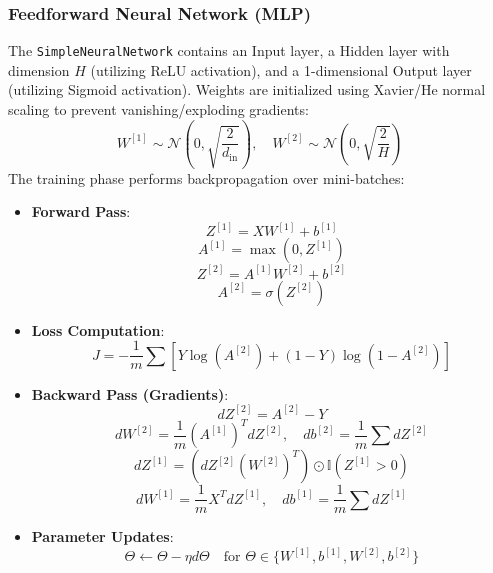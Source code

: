 \documentclass[conference]{IEEEtran}
\begin{document}
\subsubsection{Feedforward Neural Network (MLP)}
The \texttt{SimpleNeuralNetwork} contains an Input layer, a Hidden layer with dimension $H$ (utilizing ReLU activation), and a 1-dimensional Output layer (utilizing Sigmoid activation). 
Weights are initialized using Xavier/He normal scaling to prevent vanishing/exploding gradients:
\begin{equation}
W^{[1]} \sim \mathcal{N}\left(0, \sqrt{\frac{2}{d_{\text{in}}}}\right), \quad W^{[2]} \sim \mathcal{N}\left(0, \sqrt{\frac{2}{H}}\right)
\end{equation}
The training phase performs backpropagation over mini-batches:
\begin{itemize}
\item \textbf{Forward Pass}:
\begin{equation}
Z^{[1]} = X W^{[1]} + b^{[1]}
\end{equation}
\begin{equation}
A^{[1]} = \max(0, Z^{[1]})
\end{equation}
\begin{equation}
Z^{[2]} = A^{[1]} W^{[2]} + b^{[2]}
\end{equation}
\begin{equation}
A^{[2]} = \sigma(Z^{[2]})
\end{equation}
\item \textbf{Loss Computation}:
\begin{equation}
J = -\frac{1}{m} \sum \left[ Y \log(A^{[2]}) + (1 - Y) \log(1 - A^{[2]}) \right]
\end{equation}
\item \textbf{Backward Pass (Gradients)}:
\begin{equation}
dZ^{[2]} = A^{[2]} - Y
\end{equation}
\begin{equation}
dW^{[2]} = \frac{1}{m} (A^{[1]})^T dZ^{[2]}, \quad db^{[2]} = \frac{1}{m} \sum dZ^{[2]}
\end{equation}
\begin{equation}
dZ^{[1]} = \left( dZ^{[2]} (W^{[2]})^T \right) \odot \mathbb{I}(Z^{[1]} > 0)
\end{equation}
\begin{equation}
dW^{[1]} = \frac{1}{m} X^T dZ^{[1]}, \quad db^{[1]} = \frac{1}{m} \sum dZ^{[1]}
\end{equation}
\item \textbf{Parameter Updates}:
\begin{equation}
\Theta \leftarrow \Theta - \eta d\Theta \quad \text{for } \Theta \in \{W^{[1]}, b^{[1]}, W^{[2]}, b^{[2]}\}
\end{equation}
\end{itemize}
\end{document}
